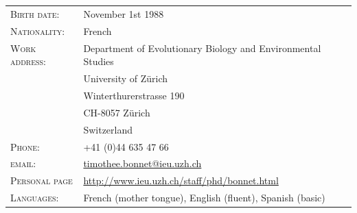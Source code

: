 \documentclass[a4paper,10pt]{article} %
\begin{document}
\subsection*{}
\begin{tabular}{p{4cm} p{11cm}}
\hfill \textsc{Birth date:} & November 1st 1988\\
\hfill \textsc{Nationality:} & French\\
\hfill \textsc{Work address:} & Department of Evolutionary Biology and Environmental Studies\\ 
									& University of Z\"{u}rich\\
									& Winterthurerstrasse 190\\
									& CH-8057 Z\"{u}rich\\
									& Switzerland \\
\hfill \textsc{Phone:} & +41 (0)44 635 47 66\\
\hfill \textsc{email:} & \href{mailto:timothee.bonnet@ieu.uzh.ch}{timothee.bonnet@ieu.uzh.ch}\\
\hfill \textsc{Personal page} & \url{http://www.ieu.uzh.ch/staff/phd/bonnet.html} \\
\hfill \textsc{Languages:} & French (mother tongue), English (fluent), Spanish (basic)
\end{tabular}
\end{document}
